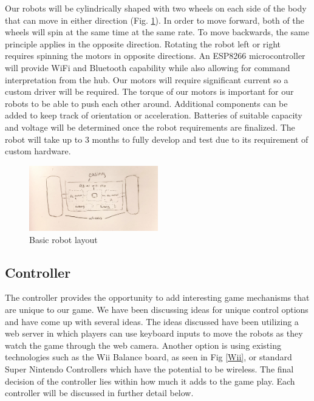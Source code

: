\documentclass[11pt]{ieeeconf}
\begin{document}
Our robots will be cylindrically shaped with two wheels on each side of the body that can move in either direction (Fig. \ref{RobotFig}). In order to move forward, both of the wheels will spin at the same time at the same rate. To move backwards, the same principle applies in the opposite direction. Rotating the robot left or right requires spinning the motors in opposite directions. An ESP8266 microcontroller will provide WiFi and Bluetooth capability while also allowing for command interpretation from the hub. Our motors will require significant current so a custom driver will be required. The torque of our motors is important for our robots to be able to push each other around. Additional components can be added to keep track of orientation or acceleration. Batteries of suitable capacity and voltage will be determined once the robot requirements are finalized. The robot will take up to 3 months to fully develop and test due to its requirement of custom hardware. 

 \begin{figure}[H]
  \centering
      \includegraphics[width=0.5\textwidth]{images/RobotSketch.pdf}
        \caption{Basic robot layout}
        \label{RobotFig}
\end{figure}

\subsection{Controller}
The controller provides the opportunity to add interesting game mechanisms that are unique to our game. We have been discussing ideas for unique control options and have come up with several ideas. The ideas discussed have been utilizing a web server in which players can use keyboard inputs to move the robots as they watch the game through the web camera. Another option is using existing technologies such as the Wii Balance board, as seen in Fig \ref{Wii}, or standard Super Nintendo Controllers which have the potential to be wireless. The final decision of the controller lies within how much it adds to the game play. Each controller will be discussed in further detail below.
\end{document}
